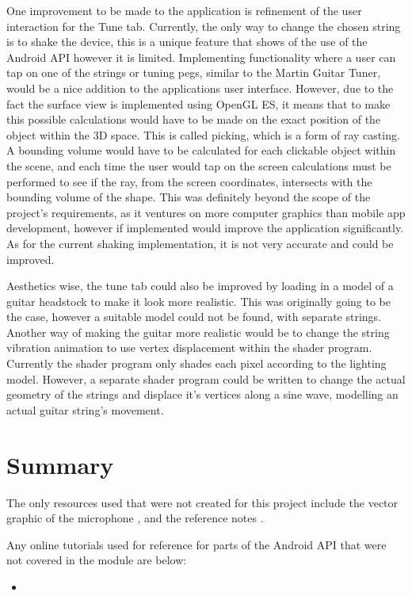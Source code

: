 \documentclass[conference]{acmsiggraph}
\begin{document}
One improvement to be made to the application is refinement of the user interaction for the Tune tab. Currently, the only way to change the chosen string is to shake the device, this is a unique feature that shows of the use of the Android API however it is limited. Implementing functionality where a user can tap on one of the strings or tuning pegs, similar to the Martin Guitar Tuner, would be a nice addition to the applications user interface. However, due to the fact the surface view is implemented using OpenGL ES, it means that to make this possible calculations would have to be made on the exact position of the object within the 3D space. This is called picking, which is a form of ray casting. \cite{ray} A bounding volume would have to be calculated for each clickable object within the scene, and each time the user would tap on the screen calculations must be performed to see if the ray, from the screen coordinates, intersects with the bounding volume of the shape. This was definitely beyond the scope of the project's requirements, as it ventures on more computer graphics than mobile app development, however if implemented would improve the application significantly. As for the current shaking implementation, it is not very accurate and could be improved.

Aesthetics wise, the tune tab could also be improved by loading in a model of a guitar headstock to make it look more realistic. This was originally going to be the case, however a suitable model could not be found, with separate strings. Another way of making the guitar more realistic would be to change the string vibration animation to use vertex displacement within the shader program. Currently the shader program only shades each pixel according to the lighting model. However, a separate shader program could be written to change the actual geometry of the strings and displace it's vertices along a sine wave, modelling an actual guitar string's movement.

\section{Summary}


The only resources used that were not created for this project include the vector graphic of the microphone \cite{microphone}, and the reference notes \cite{refNotes}.

Any online tutorials used for reference for parts of the Android API that were not covered in the module are below:
\begin{itemize}
	\item %
\end{itemize}




\end{document}
